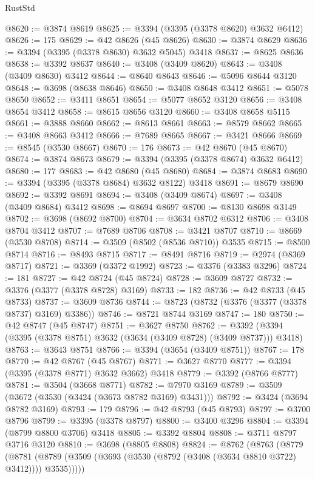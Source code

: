 \begin{lexlean}{RustStd}
\begin{coremodule}
@8620 := @3874 @8619
@8625 := @3394 (@3395 (@3378 @8620) @3632 @6412)
@8626 := 175
@8629 := @42 @8626 (@45 @8626)
@8630 := @3874 @8629
@8636 := @3394 (@3395 (@3378 @8630) @3632 @5045) @3418
@8637 := @8625 @8636
@8638 := @3392 @8637
@8640 := @3408 (@3409 @8620)
@8643 := @3408 (@3409 @8630) @3412
@8644 := @8640 @8643
@8646 := @5096 @8644 @3120
@8648 := @3698 (@8638 @8646)
@8650 := @3408 @8648 @3412
@8651 := @5078 @8650
@8652 := @3411 @8651
@8654 := @5077 @8652 @3120
@8656 := @3408 @8654 @3412
@8658 := @8615 @8656 @3120
@8660 := @3408 @8658 @5115
@8661 := @3888 @8660
@8662 := @8613 @8661
@8663 := @8579 @8662
@8665 := @3408 @8663 @3412
@8666 := @7689 @8665
@8667 := @3421 @8666
@8669 := @8545 (@3530 @8667)
@8670 := 176
@8673 := @42 @8670 (@45 @8670)
@8674 := @3874 @8673
@8679 := @3394 (@3395 (@3378 @8674) @3632 @6412)
@8680 := 177
@8683 := @42 @8680 (@45 @8680)
@8684 := @3874 @8683
@8690 := @3394 (@3395 (@3378 @8684) @3632 @8122) @3418
@8691 := @8679 @8690
@8692 := @3392 @8691
@8694 := @3408 (@3409 @8674)
@8697 := @3408 (@3409 @8684) @3412
@8698 := @8694 @8697
@8700 := @8130 @8698 @3149
@8702 := @3698 (@8692 @8700)
@8704 := @3634 @8702 @6312
@8706 := @3408 @8704 @3412
@8707 := @7689 @8706
@8708 := @3421 @8707
@8710 := @8669 (@3530 @8708)
@8714 := @3509 (@8502 (@8536 @8710)) @3535
@8715 := @8500 @8714
@8716 := @8493 @8715
@8717 := @8491 @8716
@8719 := @2974 (@8369 @8717)
@8721 := @3369 (@3372 @1992)
@8723 := @3376 (@3383 @3296)
@8724 := 181
@8727 := @42 @8724 (@45 @8724)
@8728 := @3609 @8727
@8732 := @3376 (@3377 (@3378 @8728) @3169)
@8733 := 182
@8736 := @42 @8733 (@45 @8733)
@8737 := @3609 @8736
@8744 := @8723 (@8732 (@3376 (@3377 (@3378 @8737) @3169) @3386))
@8746 := @8721 @8744 @3169
@8747 := 180
@8750 := @42 @8747 (@45 @8747)
@8751 := @3627 @8750
@8762 := @3392 (@3394 (@3395 (@3378 @8751) @3632 (@3634 (@3409 @8728) (@3409 @8737))) @3418)
@8763 := @3643 @8751
@8766 := @3394 (@3654 (@3409 @8751))
@8767 := 178
@8770 := @42 @8767 (@45 @8767)
@8771 := @3627 @8770
@8777 := @3394 (@3395 (@3378 @8771) @3632 @3662) @3418
@8779 := @3392 (@8766 @8777)
@8781 := @3504 (@3668 @8771)
@8782 := @7970 @3169
@8789 := @3509 (@3672 (@3530 (@3424 (@3673 @8782 @3169) @3431)))
@8792 := @3424 (@3694 @8782 @3169)
@8793 := 179
@8796 := @42 @8793 (@45 @8793)
@8797 := @3700 @8796
@8799 := @3395 (@3378 @8797)
@8800 := @3400 @3296
@8804 := @3394 (@8799 @8800 @3706) @3418
@8805 := @3392 @8804
@8808 := @3711 @8797 @3716 @3120
@8810 := @3698 (@8805 @8808)
@8824 := @8762
    (@8763
      (@8779
        (@8781 (@8789 (@3509 (@3693 (@3530 (@8792 (@3408 (@3634 @8810 @3722) @3412)))) @3535)))))

\end{coremodule}
\end{lexlean}
